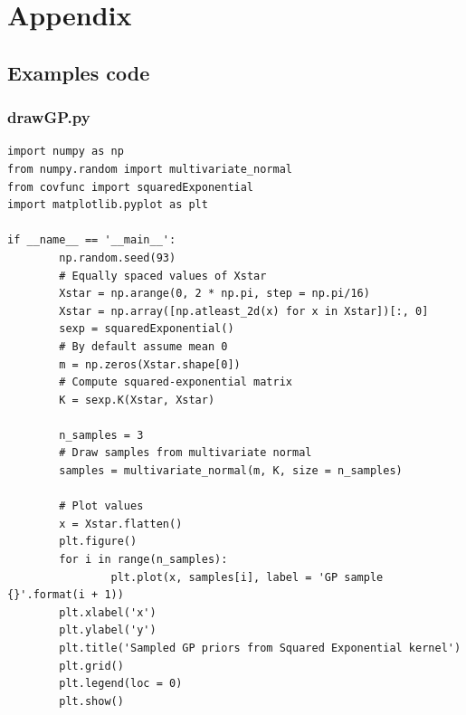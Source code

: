 \documentclass[10pt,a4paper,twoside]{book}
\begin{document}
\chapter*{Appendix}
\section*{Examples code}
\subsection*{drawGP.py}
\label{drawGP}
\begin{verbatim}
import numpy as np
from numpy.random import multivariate_normal
from covfunc import squaredExponential
import matplotlib.pyplot as plt

if __name__ == '__main__':
        np.random.seed(93)
        # Equally spaced values of Xstar
        Xstar = np.arange(0, 2 * np.pi, step = np.pi/16)
        Xstar = np.array([np.atleast_2d(x) for x in Xstar])[:, 0]
        sexp = squaredExponential()
        # By default assume mean 0
        m = np.zeros(Xstar.shape[0])
        # Compute squared-exponential matrix
        K = sexp.K(Xstar, Xstar)

        n_samples = 3
        # Draw samples from multivariate normal
        samples = multivariate_normal(m, K, size = n_samples)

        # Plot values
        x = Xstar.flatten()
        plt.figure()
        for i in range(n_samples):
                plt.plot(x, samples[i], label = 'GP sample {}'.format(i + 1))
        plt.xlabel('x')
        plt.ylabel('y')
        plt.title('Sampled GP priors from Squared Exponential kernel')
        plt.grid()
        plt.legend(loc = 0)
        plt.show()	
\end{verbatim}
\end{document}

